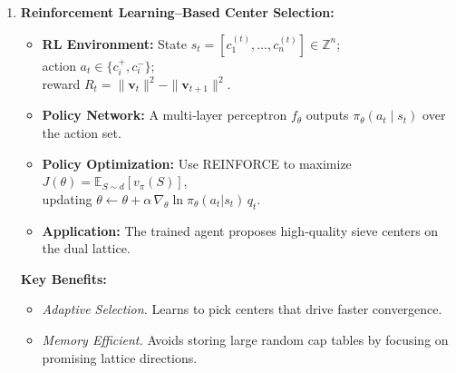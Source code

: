 \documentclass[25pt,a0paper,portrait]{tikzposter}
\begin{document}
\begin{columns}
{\begin{enumerate}
    \item \textbf{Reinforcement Learning–Based Center Selection:}
      \begin{itemize}
        \item \textbf{RL Environment:}
        State $s_t=[c_1^{(t)},\dots,c_n^{(t)}]\in\mathbb{Z}^n$;\\
        action $a_t\in\{c_i^+,c_i^-\}$;\\
        reward $R_t=\|\mathbf v_t\|^2-\|\mathbf v_{t+1}\|^2$.
        \item \textbf{Policy Network:}
          A multi‐layer perceptron $f_\theta$ outputs
          $\pi_\theta(a_t\mid s_t)$ over the action set.
        \item \textbf{Policy Optimization:}
          Use REINFORCE to maximize
          $J(\theta)=\mathbb{E}_{S\sim d}[v_\pi(S)]$,\\ updating
          $\theta\leftarrow\theta+\alpha\,\nabla_\theta\ln\pi_\theta(a_t|s_t)\,q_t$.
        \item \textbf{Application:}
          The trained agent proposes high‐quality sieve centers on the
          dual lattice.
      \end{itemize}
      \textbf{Key Benefits:}
      \begin{itemize}
        \item \emph{Adaptive Selection.} Learns to pick centers that drive
          faster convergence.
        \item \emph{Memory Efficient.} Avoids storing large random cap tables
          by focusing on promising lattice directions.
      \end{itemize}

  \end{enumerate}
}
    

\end{columns}
\end{document}
